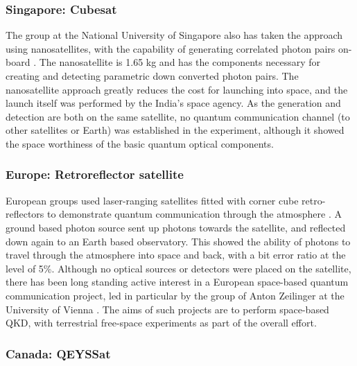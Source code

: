 \documentclass[aps,rmp,reprint,amsmath,amssymb,graphicx,longbibliography]{revtex4-1}
\begin{document}
\subsubsection{Singapore: Cubesat}

The group at the National University of Singapore also has taken the approach using nanosatellites, with the capability of generating correlated photon pairs on-board \cite{tang2016generation}.  
The nanosatellite is 1.65 kg and has the components necessary for creating and detecting parametric down converted photon pairs. The nanosatellite approach greatly reduces the cost for launching into space, and the launch itself was performed by the India’s space agency. As the generation and detection are both on the same satellite, no quantum communication channel (to other satellites or Earth) was established in the experiment, although it showed the space worthiness of the basic quantum optical components. 











\subsubsection{Europe: Retroreflector satellite}

European groups used laser-ranging satellites fitted with corner cube retro-reflectors to demonstrate quantum communication through the atmosphere \cite{villoresi08,vallone15}. A ground based photon source sent up photons towards the satellite, and reflected down again to an Earth based observatory. This showed the ability of photons to travel through the atmosphere into space and back, with a bit error ratio at the level of 5\%. Although no optical sources or detectors were placed on the satellite, there has been long standing active interest in a European space-based quantum communication project, led in particular by the group of Anton Zeilinger at the University of Vienna \cite{armengol08}.  The aims of such projects are to perform space-based QKD, with terrestrial free-space experiments \cite{ursin07,ma2012quantum} as part of the overall effort. 











\subsubsection{Canada: QEYSSat}
\end{document}
